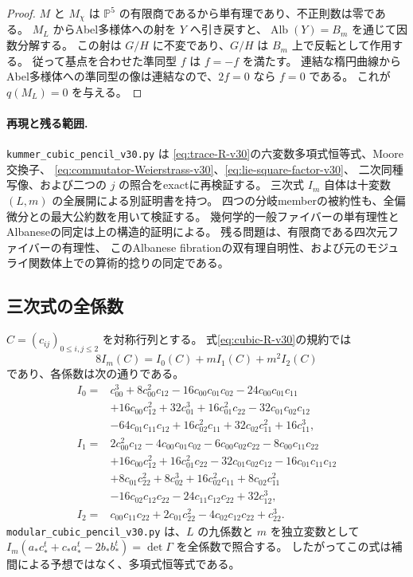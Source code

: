 \begin{proof}
$M$ と $M_\chi$ は $\mathbb P^5$ の有限商であるから単有理であり、不正則数は零である。
$M_L$ からAbel多様体への射を $Y$ へ引き戻すと、$\operatorname{Alb}(Y)=B_m$ を通じて因数分解する。
この射は $G/H$ に不変であり、$G/H$ は $B_m$ 上で反転として作用する。
従って基点を合わせた準同型 $f$ は $f=-f$ を満たす。
連結な楕円曲線からAbel多様体への準同型の像は連結なので、$2f=0$ なら $f=0$ である。
これが $q(M_L)=0$ を与える。
\end{proof}

\paragraph{再現と残る範囲.}
\nolinkurl{kummer_cubic_pencil_v30.py} は
\eqref{eq:trace-R-v30}の六変数多項式恒等式、Moore交換子、
\eqref{eq:commutator-Weierstrass-v30}、\eqref{eq:lie-square-factor-v30}、
二次同種写像、および二つの $j$ の照合をexactに再検証する。
三次式 $I_m$ 自体は十変数 $(L,m)$ の全展開による別証明書を持つ。
四つの分岐memberの被約性も、全偏微分との最大公約数を用いて検証する。
幾何学的一般ファイバーの単有理性とAlbaneseの同定は上の構造的証明による。
残る問題は、有限商である四次元ファイバーの有理性、
このAlbanese fibrationの双有理自明性、および元のモジュライ関数体上での算術的捻りの同定である。

\subsection{三次式の全係数}
\label{subsec:explicit-cubic-v30}
$C=(c_{ij})_{0\le i,j\le2}$ を対称行列とする。
式\eqref{eq:cubic-R-v30}の規約では
\[
 8I_m(C)=I_0(C)+mI_1(C)+m^2I_2(C)
\]
であり、各係数は次の通りである。
\begin{align*}
 I_0={}&c_{00}^3+8c_{00}^2c_{12}-16c_{00}c_{01}c_{02}-24c_{00}c_{01}c_{11}\\
 &+16c_{00}c_{12}^2+32c_{01}^3+16c_{01}^2c_{22}-32c_{01}c_{02}c_{12}\\
 &-64c_{01}c_{11}c_{12}+16c_{02}^2c_{11}+32c_{02}c_{11}^2+16c_{11}^3,\\[.4em]
 I_1={}&2c_{00}^2c_{12}-4c_{00}c_{01}c_{02}-6c_{00}c_{02}c_{22}-8c_{00}c_{11}c_{22}\\
 &+16c_{00}c_{12}^2+16c_{01}^2c_{22}-32c_{01}c_{02}c_{12}-16c_{01}c_{11}c_{12}\\
 &+8c_{01}c_{22}^2+8c_{02}^3+16c_{02}^2c_{11}+8c_{02}c_{11}^2\\
 &-16c_{02}c_{12}c_{22}-24c_{11}c_{12}c_{22}+32c_{12}^3,\\[.4em]
 I_2={}&c_{00}c_{11}c_{22}+2c_{01}c_{22}^2-4c_{02}c_{12}c_{22}+c_{22}^3.
\end{align*}
\nolinkurl{modular_cubic_pencil_v30.py} は、$L$ の九係数と $m$ を独立変数として
$I_m(a_*c_*^t+c_*a_*^t-2b_*b_*^t)=\det\Gamma$ を全係数で照合する。
したがってこの式は補間による予想ではなく、多項式恒等式である。
